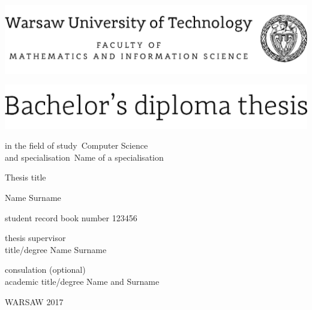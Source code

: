 \documentclass[12pt,twoside,a4paper]{article}
\newcommand{\discipline}{Computer Science}
\newcommand{\spec}{Name of a specialisation}
\renewcommand{\title}{Thesis title}
\renewcommand{\author}{Name Surname}
\newcommand{\supervisor}{title/degree Name Surname}
\newcommand{\album}{123456}
\renewcommand{\year}{2017}
\begin{document}
\pagestyle{empty}


\begin{center}
\includegraphics[scale=1.]{img/wut}
\vspace{70pt}


\includegraphics[scale=1.]{img/bachelor} %

{ \arial
in the field of study~\discipline \\
and specialisation~\spec

\vspace{30pt}
{\arial \large \title}

\vspace{50pt}

{\arial \huge \author}

\vspace{5pt}

student record book number \album

\vspace{40pt}

thesis supervisor \\
{\arial \supervisor}

\vspace{15pt}
 
consulation (optional)  \\
{\arial academic title/degree Name and Surname}

 \vfill
WARSAW \year \\
}
\end{center}


%
%
\end{document}
